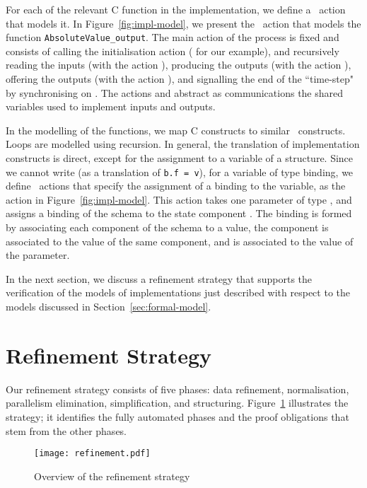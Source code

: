 \documentclass[submission]{eptcs}
\begin{document}
For each of the relevant C function in the implementation, we define a \Circus~action that models it. In Figure~\ref{fig:impl-model}, we present the \Circus~action that models the function
\texttt{AbsoluteValue\_output}. The main action of the process is fixed and consists of calling the initialisation action ( for our example), and recursively reading the inputs (with the action ), producing the outputs (with the action ), offering the outputs (with the action ), and signalling the end of the ``time-step" by synchronising on . The actions  and  abstract as communications the shared variables used to implement inputs and outputs.



In the modelling of the functions, we map C constructs to
similar \Circus~constructs. Loops are modelled using recursion. In general,
the translation of implementation constructs is direct, except for the assignment
to a variable of a structure. Since we cannot write  (as a translation
of \texttt{b.f = v}), for a variable  of type binding, we define \Circus~actions
that specify the assignment of a binding to the variable, as the action
 in Figure~\ref{fig:impl-model}. This action takes one parameter
 of type , and assigns a binding of the schema 
to the state component . The binding is formed by associating each component
of the schema to a value, the component  is associated to the value of
the same component, and  is associated to the value of the parameter.

In the next section, we discuss a refinement strategy that supports the verification of the models of implementations just described with respect to the models discussed in Section~\ref{sec:formal-model}.



\section{Refinement Strategy}
\label{sec:strategy}

Our refinement strategy consists of five phases: data refinement, normalisation, parallelism elimination, simplification, and structuring. Figure~\ref{fig:strategy} illustrates the strategy; it identifies the fully automated phases and the proof obligations that stem from the other phases.

\begin{figure}
\centering
\texttt{[image: refinement.pdf]}
\caption{Overview of the refinement strategy}
\label{fig:strategy}
\end{figure}
\end{document}
